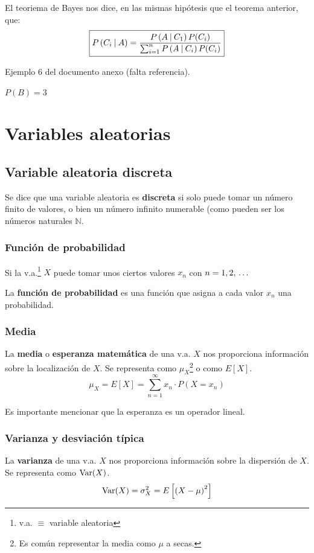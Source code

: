 \documentclass[a4paper]{book}
\begin{document}
\begin{teorema}
	El teoriema de Bayes nos dice, en las mismas hipótesis que el teorema anterior, que: \[\boxed{P \left( C_i \: \middle\vert\: A \right)=\frac{P \left( A \: \middle\vert\: C_1 \right)P(C_i)}{\sum^{n}_{i=1}{P \left( A \: \middle\vert\: C_i \right)P(C_i)}}}\]
\end{teorema}

Ejemplo 6 del documento anexo (falta referencia). %

$P(B) = 3$

\chapter{Variables aleatorias}

\section{Variable aleatoria discreta}
Se dice que una variable aleatoria es \textbf{discreta} si solo puede tomar un número finito de valores, o bien un número infinito numerable (como pueden ser los números naturales $\mathbb{N}$.

\subsection{Función de probabilidad}
Si la v.a.\footnote{v.a. $\equiv$ variable aleatoria} $X$ puede tomar unos ciertos valores $x_n$ con $n=1, 2, \, \ldots \, $

La \textbf{función de probabilidad} es una función que asigna a cada valor $x_n$ una probabilidad.

\subsection{Media}
La \textbf{media} o \textbf{esperanza matemática} de una v.a. $X$ nos proporciona información sobre la localización de $X$. Se representa como $\mu _X$\footnote{Es común representar la media como $\mu$ a secas.} o como $E[X]$.
\[\mu _X = E[X] = \sum^{\infty}_{n=1}{x_n \cdot P(X=x_n)}\]

\begin{nota}
	Es importante mencionar que la esperanza es un operador lineal.
\end{nota}

\subsection{Varianza y desviación típica}
La \textbf{varianza} de una v.a. $X$ nos proporciona información sobre la dispersión de $X$. Se representa como $\operatorname{Var}(X)$.
\[\operatorname{Var}(X) = \sigma_X^2 = E\left[ \left( X-\mu \right)^2 \right]\]
\end{document}
